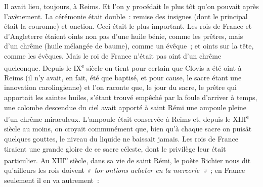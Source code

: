 \documentclass[french,twoside]{book} %
\begin{document}
Il avait lieu, toujours, à Reims. Et l’on y procédait le plus tôt qu’on pouvait après l’avènement. La cérémonie était double : remise des insignes (dont le principal était la couronne) et onction. Ceci était le plus important. Les rois de France et d’Angleterre étaient oints non pas d’une huile bénie, comme les prêtres, mais d’un chrême (huile mélangée de baume), comme un évêque ; et oints sur la tête, comme les évêques. Mais le roi de France n’était pas oint d’un chrême quelconque. Depuis le IX\textsuperscript{e} siècle on tient pour certain que Clovis a été oint à Reims (il n’y avait, en fait, été que baptisé, et pour cause, le sacre étant une innovation carolingienne) et l’on raconte que, le jour du sacre, le prêtre qui apportait les saintes huiles, s’étant trouvé empêché par la foule d’arriver à temps, une colombe descendue du ciel avait apporté à saint Rémi une ampoule pleine d’un chrême miraculeux. L’ampoule était conservée à Reims et, depuis le XIII\textsuperscript{e} siècle au moins, on croyait communément que, bien qu’à chaque sacre on puisât quelques gouttes, le niveau du liquide ne baissait jamais. Les rois de France tiraient une grande gloire de ce sacre céleste, dont le privilège leur était particulier. Au XIII\textsuperscript{e} siècle, dans sa vie de saint Rémi, le poète Richier nous dit qu’ailleurs les rois doivent \emph{« lor ontions acheter en la mercerie »} ; en France seulement il en va autrement :\par
\end{document}
